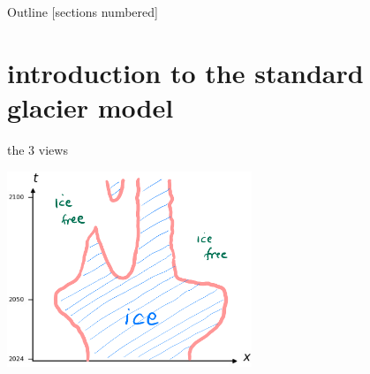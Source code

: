 \documentclass[10pt,dvipsnames]{beamer}
\theoremstyle{theorem}
\begin{document}
\begin{frame}{Outline}
  [sections numbered]
  \tableofcontents[hideallsubsections]
\end{frame}

\AtBeginSection[]
{%
}

\section{introduction to the standard glacier model}

\begin{frame}{the 3 views}

\vspace{-2mm}
\begin{center}
\includegraphics[width=0.55\textwidth]{xtcrop}
\end{center}


\end{frame}
\end{document}
